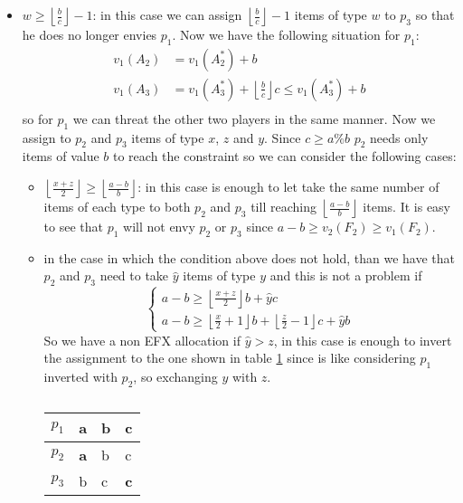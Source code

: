 \begin{itemize}
    \item $w \ge \left \lfloor \frac{b}{c}\right \rfloor - 1$: in this case we can assign $\left \lfloor \frac{b}{c}\right \rfloor - 1$ items of type $w$ to $p_3$ so that he does no longer envies $p_1$. Now we have the following situation for $p_1$:
    \begin{align*}
        v_1(A_2) &= v_1(A_2^*) + b\\
        v_1(A_3) &= v_1(A_3^*)  +\left \lfloor \frac{b}{c}\right \rfloor c \le v_1(A_3^*)  + b \\
    \end{align*}
    so for $p_1$ we can threat the other two players in the same manner. Now we assign to $p_2$ and $p_3$ items of type $x$, $z$ and $y$. Since $c \ge a\%b$ $p_2$ needs only items of value $b$ to reach the constraint so we can consider the following cases:
    \begin{itemize}
        \item $ \left \lfloor \frac{x+z}{2}\right \rfloor \ge  \left \lfloor \frac{a-b}{b}\right \rfloor$: in this case is enough to let take the same number of items of each type to both $p_2$ and $p_3$ till reaching $\left \lfloor \frac{a-b}{b}\right \rfloor$ items. It is easy to see that $p_1$ will not envy $p_2$ or $p_3$ since $a-b\ge v_2(F_2) \ge v_1(F_2)$.
        \item in the case in which the condition above does not hold, than we have that $p_2$ and $p_3$ need to take $\hat y$ items of type $y$ and this is not a problem if
        \begin{equation*}
            \begin{cases}
                a -b \ge  \left \lfloor \frac{x+z}{2}\right \rfloor b + \hat{y}c\\
                a -b \ge  \left \lfloor \frac{x}{2} + 1\right \rfloor b +  \left \lfloor \frac{z}{2} - 1\right \rfloor c + \hat{y}b
            \end{cases}
        \end{equation*}
        So we have a non EFX allocation if $\hat{y} > z$, in this case is enough to invert the assignment to the one shown in table \ref{table-3-players-aab-invert-w-greater-second-case} since is like considering $p_1$ inverted with $p_2$, so exchanging $y$ with $z$.
        \begin{table}[h]
            \centering
                \begin{tabular}{|l|l|l|l|}
                \hline
                $p_1$ & a          & \textbf{b} & c           \\ \hline
                $p_2$ & \textbf{a} & b          & c           \\ \hline
                $p_3$ & b          & c          & \textbf{c}  \\ \hline
                \end{tabular}
            \caption{}
            \label{table-3-players-aab-invert-w-greater-second-case}
        \end{table}
    \end{itemize}
    

\end{itemize}
